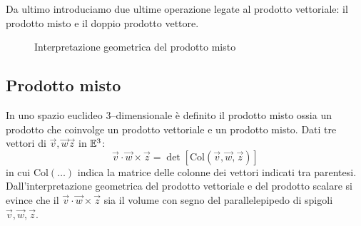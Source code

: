Da ultimo introduciamo due ultime operazione legate al prodotto vettoriale: il 
prodotto misto
e il doppio prodotto vettore.

\begin{figure}[h!]
\begin{center}
{\small
\begin{inaccessibleblock}[TODO.]
{}
\end{inaccessibleblock}
}
\caption{\small Interpretazione geometrica del prodotto misto}%
\end{center}
\end{figure}

\subsection*{Prodotto misto}
In uno spazio euclideo 3--dimensionale è definito il prodotto misto ossia un 
prodotto che
coinvolge un prodotto vettoriale e un prodotto misto. Dati tre vettori di $\vec 
v,\vec w\vec z$ 
in $\mathbb{E}^{3}$:
\[
  \vec v\cdot \vec w\times\vec z = \det[\textrm{Col}(\vec v,\vec w, \vec z)]
\]
in cui $\textrm{Col}(\ldots)$ indica la matrice delle colonne dei vettori 
indicati tra parentesi.
Dall'interpretazione geometrica del prodotto vettoriale e del prodotto scalare 
si 
evince che il $\vec v\cdot \vec w\times\vec z$ sia il volume con segno del 
parallelepipedo di 
spigoli $\vec v,\vec w, \vec z$.

